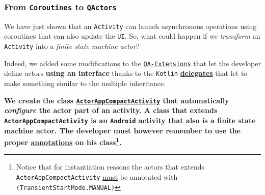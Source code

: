 \subsubsection{From \texttt{Coroutines} to \texttt{QActors}}

We have just shown that an \texttt{Activity} can launch asynchronous operations using coroutines that can also update the \texttt{UI}. So, what could happen if we \textit{transform} an \texttt{Activity} into a \textit{finite state machine actor}?

Indeed, we added some modifications to the \href{https://github.com/LM-96/QA-Extensions}{\texttt{QA-Extensions}} that let the developer define actors \textbf{using an interface} thanks to the \texttt{Kotlin} \href{https://kotlinlang.org/docs/delegated-properties.html}{\textbf{delegates}} that let to make something similar to the multiple inheritance.

\begin{tcolorbox}
	\begin{center}
		\textbf{We create the class \href{https://github.com/LucaLand/MobileSystemsProject-LL/blob/0.9.1/app/src/main/java/it/unibo/mobilesystems/actors/ActorAppCompactActivity.kt}{\texttt{ActorAppCompactActivity}} that automatically \textit{configure} the actor part of an activity. A class that extends \texttt{ActorAppCompactActivity} is an \texttt{Android} activity that also is a finite state machine actor. The developer must however remember to use the proper \href{https://github.com/LM-96/QA-Extensions/tree/android/it.unibo.qakactor/src/main/kotlin/annotations}{annotations} on his class\footnote{Notice that for instantiation reasons the actors that extends \texttt{ActorAppCompactActivity} \underline{must} be annotated with \texttt{\@StartMode(TransientStartMode.MANUAL)}}.}
	\end{center}
\end{tcolorbox}

 


